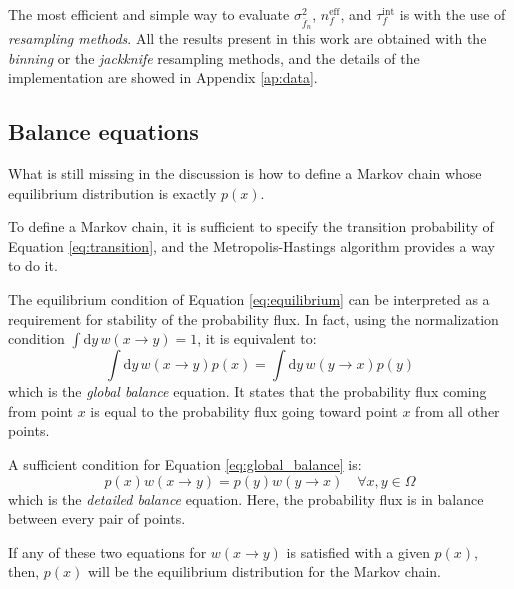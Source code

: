 The most efficient and simple way to evaluate $\sigma_{\overline f_n}^2$, $n_f^\mathrm{eff}$, and $\tau_f^\mathrm{int}$ is with the use of \emph{resampling methods}.
All the results present in this work are obtained with the \emph{binning} or the \emph{jackknife} resampling methods,
and the details of the implementation are showed in Appendix \ref{ap:data}.

\subsection*{Balance equations}
What is still missing in the discussion is how to define a Markov chain whose equilibrium distribution is exactly $p(x)$.

To define a Markov chain, it is sufficient to specify the transition probability of Equation \eqref{eq:transition},
and the Metropolis-Hastings algorithm provides a way to do it.

The equilibrium condition of Equation \eqref{eq:equilibrium}
can be interpreted as a requirement for stability of the probability flux.
In fact, using the normalization condition $\int\mathrm dy\,w(x \to y) = 1$,
it is equivalent to:
\begin{equation}\label{eq:global_balance}
	\int\mathrm dy\,w(x \to y)p(x) = \int\mathrm dy\,w(y \to x)p(y)
\end{equation}
which is the \emph{global balance} equation.
It states that the probability flux coming from point $x$
is equal to the probability flux going toward point $x$ from all other points.

A sufficient condition for Equation \eqref{eq:global_balance} is:
\begin{equation}\label{eq:detailed_balance}
	p(x)w(x \to y) = p(y)w(y \to x) \quad \forall x,y\in\Omega
\end{equation}
which is the \emph{detailed balance} equation.
Here, the probability flux is in balance between every pair of points.

If any of these two equations for $w(x \to y)$ is satisfied with a given $p(x)$,
then, $p(x)$ will be the equilibrium distribution for the Markov chain.

